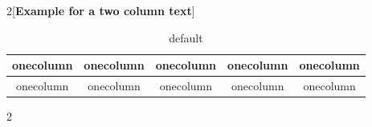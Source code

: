 \documentclass{article}
\begin{document}
  \begin{multicols}{2}[\textbf{Example for a two column text}]
    \blindtext
  \end{multicols}
\begin{table}[ht]
\caption{default}
\begin{center}
\begin{tabular}{|c|c|c|c|c|}
\hline
onecolumn & onecolumn & onecolumn & onecolumn & onecolumn\\
\hline
onecolumn & onecolumn & onecolumn & onecolumn & onecolumn\\
\hline
\end{tabular}
\end{center}
\label{default}
\end{table}%
  \begin{multicols}{2}
    \blindtext[10]
  \end{multicols}
\end{document}
